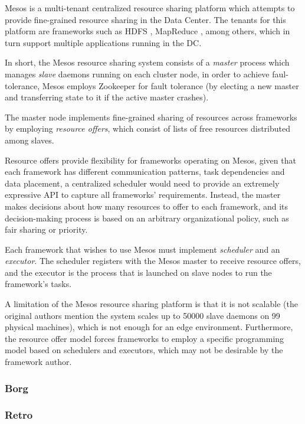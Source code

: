 Mesos \cite{hindman2011mesos} is a multi-tenant centralized resource sharing platform which attempts to provide fine-grained resource sharing in the  Data Center. The tenants for this platform are frameworks such as HDFS \cite{borthakur2008hdfs}, MapReduce \cite{dean2008mapreduce}, among others, which in turn support multiple applications running in the DC.

In short, the Mesos resource sharing system consists of a \textit{master} process which manages \textit{slave} daemons running on each cluster node, in order to achieve faul-tolerance, Mesos employs Zookeeper \cite{hunt2010zookeeper} for fault tolerance (by electing a new master and transferring state to it if the active master crashes).

The master node implements fine-grained sharing of resources across frameworks by employing \textit{resource offers}, which consist of lists of free resources distributed among slaves.

Resource offers provide flexibility for frameworks operating on Mesos, given that each framework has different communication patterns, task dependencies and data placement, a centralized scheduler would need to provide an extremely expressive API to capture all frameworks' requirements. Instead, the master makes decisions about how many resources to offer to each framework, and its decision-making process is based on an arbitrary organizational policy, such as fair sharing or priority. 

Each framework that wishes to use Mesos must implement \textit{scheduler} and an \textit{executor}. The scheduler registers with the Mesos master to receive resource offers, and the executor is the process that is launched on slave nodes to run the framework's tasks.

A limitation of the Mesos resource sharing platform is that it is not scalable (the original authors mention the system scales up to 50000 slave daemons on 99 physical machines), which is not enough for an edge environment. Furthermore, the resource offer model forces frameworks to employ a specific programming model based on schedulers and executors, which may not be desirable by the framework author.

\subsubsection{Borg}

\subsubsection{Retro}

